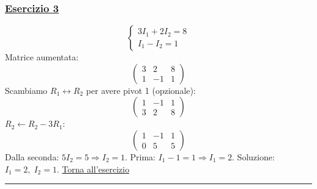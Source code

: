 \subsubsection*{\hyperref[ex:3]{Esercizio 3}}
\[
\begin{cases}
3I_1 + 2I_2 = 8 \\
I_1 - I_2 = 1
\end{cases}
\]
Matrice aumentata:
\[
\left(\begin{array}{cc|c}
3 & 2 & 8 \\
1 & -1 & 1
\end{array}\right)
\]
Scambiamo \(R_1 \leftrightarrow R_2\) per avere pivot 1 (opzionale):
\[
\left(\begin{array}{cc|c}
1 & -1 & 1 \\
3 & 2 & 8
\end{array}\right)
\]
\(R_2 \leftarrow R_2 - 3R_1\):
\[
\left(\begin{array}{cc|c}
1 & -1 & 1 \\
0 & 5 & 5
\end{array}\right)
\]
Dalla seconda: \(5I_2 = 5 \Rightarrow I_2 = 1\).
Prima: \(I_1 - 1 = 1 \Rightarrow I_1 = 2\).
Soluzione: \(I_1 = 2,\; I_2 = 1\). \hfill \hyperlink{ex:3}{Torna all'esercizio}\\
\hrule

